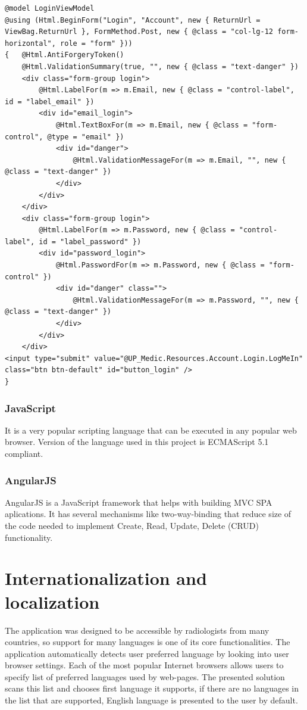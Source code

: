 \documentclass[12pt, twoside, openany]{report}
\theoremstyle{definition}
\begin{document}
\begin{lstlisting}[style=sharpc,caption=Razor view code filled with C\# embeddings that is later converted to pure HTML code with properly translated strings\label{register-view}]
@model LoginViewModel
@using (Html.BeginForm("Login", "Account", new { ReturnUrl = ViewBag.ReturnUrl }, FormMethod.Post, new { @class = "col-lg-12 form-horizontal", role = "form" }))
{   @Html.AntiForgeryToken()
	@Html.ValidationSummary(true, "", new { @class = "text-danger" })
	<div class="form-group login">
		@Html.LabelFor(m => m.Email, new { @class = "control-label", id = "label_email" })
		<div id="email_login">
			@Html.TextBoxFor(m => m.Email, new { @class = "form-control", @type = "email" })
			<div id="danger">
				@Html.ValidationMessageFor(m => m.Email, "", new { @class = "text-danger" })
			</div>
		</div>
	</div>
	<div class="form-group login">
		@Html.LabelFor(m => m.Password, new { @class = "control-label", id = "label_password" })
		<div id="password_login">
			@Html.PasswordFor(m => m.Password, new { @class = "form-control" })
			<div id="danger" class="">
				@Html.ValidationMessageFor(m => m.Password, "", new { @class = "text-danger" })
			</div>
		</div>
    </div>
<input type="submit" value="@UP_Medic.Resources.Account.Login.LogMeIn" class="btn btn-default" id="button_login" />
}
\end{lstlisting}

\subsubsection{JavaScript}
It is a very popular scripting language that can be executed in any popular web browser. Version of the language used in this project is ECMAScript 5.1 compliant. 
\subsubsection{AngularJS}
AngularJS is a JavaScript framework that helps with building MVC SPA aplications. It has several mechanisms like two-way-binding that reduce size of the code needed to implement Create, Read, Update, Delete (CRUD) functionality.





\section{Internationalization and localization}
The application was designed to be accessible by radiologists from many countries, so support for many languages is one of its core functionalities. The application automatically detects user preferred language by looking into user browser settings. Each of the most popular Internet browsers allows users to specify list of preferred languages used by web-pages. The presented solution scans this list and chooses first language it supports, if there are no languages in the list that are supported, English language is presented to the user by default.
\end{document}
